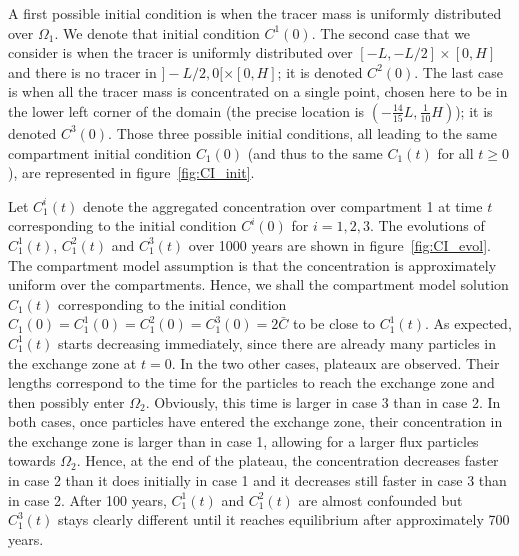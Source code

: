 A first possible initial condition is when the tracer mass is uniformly distributed over $\Omega_1$. We denote that initial condition $C^1(0)$. The second case that we consider is when the tracer is uniformly distributed over $[-L,-L/2]\times[0,H]$ and there is no tracer in $]-L/2,0[\times[0,H]$; it is denoted $C^2(0)$. The last case is when all the tracer mass is concentrated on a single point, chosen here to be in the lower left corner of the domain (the precise location is $(-\frac{14}{15}L,\frac{1}{10}H)$); it is denoted $C^3(0)$. Those three possible initial conditions, all leading to the same compartment initial condition $C_1(0)$ (and thus to the same $C_1(t)$ for all $t \ge 0$), are represented in figure~\ref{fig:CI_init}. 

Let $C_1^i(t)$ denote the aggregated concentration over compartment 1 at time $t$ corresponding to the initial condition $C^i(0)$ for $i = 1,2,3$. The evolutions of $C^1_1(t)$, $C^2_1(t)$ and $C^3_1(t)$ over 1000 years are shown in figure~\ref{fig:CI_evol}. The compartment model assumption is that the concentration is approximately uniform over the compartments. Hence, we shall the compartment model solution $C_1(t)$ corresponding to the initial condition $C_1(0) = C^1_1(0) = C^2_1(0) = C^3_1(0) = 2\bar C$ to be close to $C^1_1(t)$. As expected, $C_1^1(t)$ starts decreasing immediately, since there are already many particles in the exchange zone at $t=0$. In the two other cases, plateaux are observed. Their lengths correspond to the time for the particles to reach the exchange zone and then possibly enter $\Omega_2$. Obviously, this time is larger in case 3 than in case 2. In both cases, once particles have entered the exchange zone, their concentration in the exchange zone is larger than in case 1, allowing for a larger flux particles towards $\Omega_2$. Hence, at the end of the plateau, the concentration decreases faster in case 2 than it does initially in case 1 and it decreases still faster in case 3 than in case 2. After 100 years, $C^1_1(t)$ and $C^2_1(t)$ are almost confounded but $C^3_1(t)$ stays clearly different until it reaches equilibrium after approximately 700 years.

